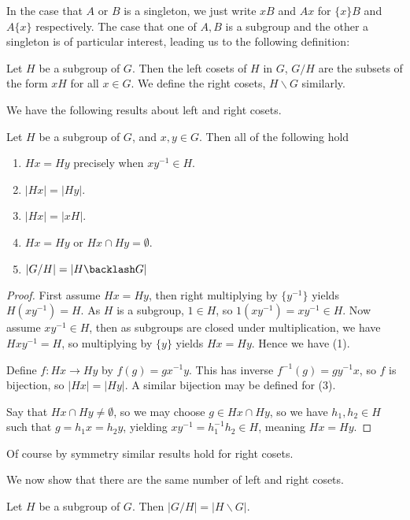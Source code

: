 \documentclass[]{article}
\begin{document}
In the case that $A$ or $B$ is a singleton, we just write $xB$ and $Ax$ for $\{x\}B$ and $A\{x\}$ respectively. The case that one of $A, B$ is a subgroup and the other a singleton is of particular interest, leading us to the following definition:

\begin{defi} [Cosets]
	Let $H$ be a subgroup of $G$. Then the left cosets of $H$ in $G$, $G / H$ are the subsets of the form $xH$ for all $x \in G$. We define the right cosets, $H \backslash G$ similarly.	
\end{defi}

We have the following results about left and right cosets.

\begin{thm}
		Let $H$ be a subgroup of $G$, and $x, y \in G$. Then all of the following hold
		\begin{enumerate}
				\item $Hx = Hy$ precisely when $xy^{-1} \in H$. 
				\item $|Hx| = |Hy|$.
				\item $|Hx| = |xH|$.
				\item $Hx = Hy$ or $Hx \cap Hy = \emptyset$.
				\item $|G / H| = |H \backlash G|$
		\end{enumerate}
\end{thm}

\begin{proof}
		First assume $Hx = Hy$, then right multiplying by $\{y^{-1}\}$ yields $H(xy^{-1}) = H$. As $H$ is a subgroup, $1 \in H$, so $1(xy^{-1}) = xy^{-1} \in H$. Now assume $xy^{-1} \in H$, then as subgroups are closed under multiplication, we have $Hxy^{-1} = H$, so multiplying by $\{y\}$ yields $Hx = Hy$. Hence we have (1).

		Define $f: Hx \to Hy$ by $f(g) = gx^{-1}y$. This has inverse $f^{-1}(g) = gy^{-1}x$, so $f$ is bijection, so $|Hx| = |Hy|$.	A similar bijection may be defined for (3).

		Say that $Hx \cap Hy \neq \emptyset$, so we may choose $g \in Hx \cap Hy$, so we have $h_1, h_2 \in H$ such that $g = h_1x = h_2y$, yielding $xy^{-1} = h_1^{-1}h_2 \in H$, meaning $Hx = Hy$.
\end{proof}

Of course by symmetry similar results hold for right cosets.

We now show that there are the same number of left and right cosets.

\begin{thm}
		Let $H$ be a subgroup of $G$. Then $|G / H| = |H \backslash G|$.
\end{thm}
\end{document}
